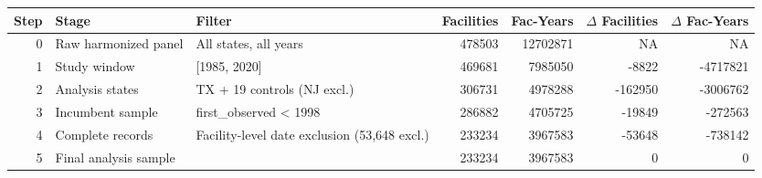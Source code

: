 \begin{table}
\centering\begingroup\fontsize{9}{11}\selectfont

\begin{tabular}[t]{rllrrrr}
\toprule
Step & Stage & Filter & Facilities & Fac-Years & $\Delta$ Facilities & $\Delta$ Fac-Years\\
\midrule
0 & Raw harmonized panel & All states, all years & 478503 & 12702871 & NA & NA\\
1 & Study window & {}[1985, 2020] & 469681 & 7985050 & -8822 & -4717821\\
2 & Analysis states & TX + 19 controls (NJ excl.) & 306731 & 4978288 & -162950 & -3006762\\
3 & Incumbent sample & first\_observed < 1998 & 286882 & 4705725 & -19849 & -272563\\
4 & Complete records & Facility-level date exclusion (53,648 excl.) & 233234 & 3967583 & -53648 & -738142\\
5 & Final analysis sample &  & 233234 & 3967583 & 0 & 0\\
\bottomrule
\end{tabular}
\endgroup{}
\end{table}

